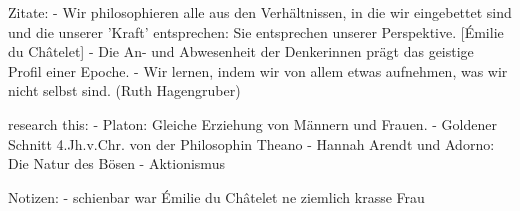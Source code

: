 Zitate:
-   Wir philosophieren alle aus den Verhältnissen, in die wir eingebettet sind und die 
    unserer 'Kraft' entsprechen: Sie entsprechen unserer Perspektive. [Émilie du Châtelet]
-   Die An- und Abwesenheit der Denkerinnen prägt das geistige Profil einer Epoche.
-   Wir lernen, indem wir von allem etwas aufnehmen, was wir nicht selbst sind.
(Ruth Hagengruber)


research this:
-   Platon: Gleiche Erziehung von Männern und Frauen.
-   Goldener Schnitt 4.Jh.v.Chr. von der Philosophin Theano
-   Hannah Arendt und Adorno: Die Natur des Bösen
-   Aktionismus





Notizen:
-   schienbar war Émilie du Châtelet ne ziemlich krasse Frau